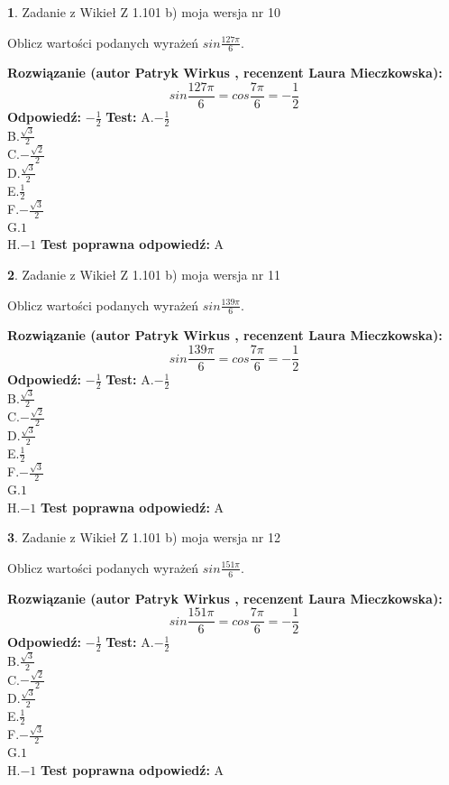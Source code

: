 \documentclass[12pt, a4paper]{article}
\theoremstyle{definition} %
\newtheorem{zad}{}
\newcommand{\zadStart}[1]{\begin{zad}#1\newline}
\newcommand{\zadStop}{\end{zad}}
\newcommand{\rozwStart}[2]{\noindent \textbf{Rozwiązanie (autor #1 , recenzent #2): }\newline}
\newcommand{\rozwStop}{\newline}
\newcommand{\odpStart}{\noindent \textbf{Odpowiedź:}\newline}
\newcommand{\odpStop}{\newline}
\newcommand{\testStart}{\noindent \textbf{Test:}\newline}
\newcommand{\testStop}{\newline}
\newcommand{\kluczStart}{\noindent \textbf{Test poprawna odpowiedź:}\newline}
\newcommand{\kluczStop}{\newline}
\begin{document}
\zadStart{Zadanie z Wikieł Z 1.101 b) moja wersja nr 10}

Oblicz wartości podanych wyrażeń $sin \frac{127\pi}{6}$.
\zadStop
\rozwStart{Patryk Wirkus}{Laura Mieczkowska}
$$sin \frac{127\pi}{6} = cos \frac{7\pi}{6} = -\frac{1}{2}$$
\rozwStop
\odpStart
$-\frac{1}{2}$
\odpStop
\testStart
A.$-\frac{1}{2}$\\
B.$\frac{\sqrt{3}}{2}$\\
C.$-\frac{\sqrt{2}}{2}$\\
D.$\frac{\sqrt{3}}{2}$\\
E.$\frac{1}{2}$\\
F.$-\frac{\sqrt{3}}{2}$\\
G.$1$\\
H.$-1$
\testStop
\kluczStart
A
\kluczStop



\zadStart{Zadanie z Wikieł Z 1.101 b) moja wersja nr 11}

Oblicz wartości podanych wyrażeń $sin \frac{139\pi}{6}$.
\zadStop
\rozwStart{Patryk Wirkus}{Laura Mieczkowska}
$$sin \frac{139\pi}{6} = cos \frac{7\pi}{6} = -\frac{1}{2}$$
\rozwStop
\odpStart
$-\frac{1}{2}$
\odpStop
\testStart
A.$-\frac{1}{2}$\\
B.$\frac{\sqrt{3}}{2}$\\
C.$-\frac{\sqrt{2}}{2}$\\
D.$\frac{\sqrt{3}}{2}$\\
E.$\frac{1}{2}$\\
F.$-\frac{\sqrt{3}}{2}$\\
G.$1$\\
H.$-1$
\testStop
\kluczStart
A
\kluczStop



\zadStart{Zadanie z Wikieł Z 1.101 b) moja wersja nr 12}

Oblicz wartości podanych wyrażeń $sin \frac{151\pi}{6}$.
\zadStop
\rozwStart{Patryk Wirkus}{Laura Mieczkowska}
$$sin \frac{151\pi}{6} = cos \frac{7\pi}{6} = -\frac{1}{2}$$
\rozwStop
\odpStart
$-\frac{1}{2}$
\odpStop
\testStart
A.$-\frac{1}{2}$\\
B.$\frac{\sqrt{3}}{2}$\\
C.$-\frac{\sqrt{2}}{2}$\\
D.$\frac{\sqrt{3}}{2}$\\
E.$\frac{1}{2}$\\
F.$-\frac{\sqrt{3}}{2}$\\
G.$1$\\
H.$-1$
\testStop
\kluczStart
A
\kluczStop
\end{document}
